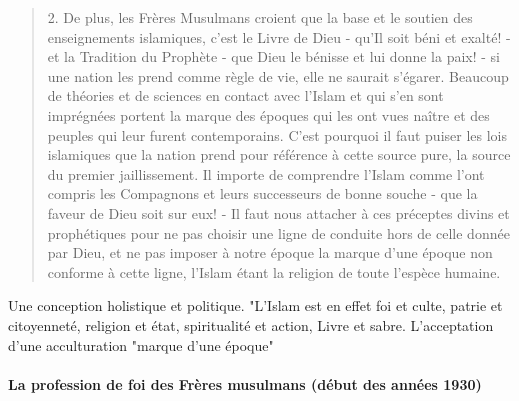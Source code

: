 \begin{quote}
2.
  De plus, les Frères Musulmans croient que la base et le soutien des
  enseignements islamiques, c'est le Livre de Dieu - qu'Il soit béni et
  exalté! - et la Tradition du Prophète - que Dieu le bénisse et lui
  donne la paix! - si une nation les prend comme règle de vie, elle ne
  saurait s'égarer. Beaucoup de théories et de sciences en contact avec
  l'Islam et qui s'en sont imprégnées portent la marque des époques qui
  les ont vues naître et des peuples qui leur furent contemporains.
  C'est pourquoi il faut puiser les lois islamiques que la nation prend
  pour référence à cette source pure, la source du premier
  jaillissement. Il importe de comprendre l'Islam comme l'ont compris
  les Compagnons et leurs successeurs de bonne souche - que la faveur de
  Dieu soit sur eux! - Il faut nous attacher à ces préceptes divins et
  prophétiques pour ne pas choisir une ligne de conduite hors de celle
  donnée par Dieu, et ne pas imposer à notre époque la marque d'une
  époque non conforme à cette ligne, l'Islam étant la religion de toute
  l'espèce humaine.
\end{quote}

  \begin{Synthesis}
   Une conception holistique et politique.  "L'Islam est en effet foi et culte, patrie et citoyenneté, religion et état, spiritualité et action, Livre et sabre.
   L'acceptation d'une acculturation "marque d'une époque"
  \end{Synthesis}
 

\paragraph{La profession de foi des Frères musulmans (début des années 1930)}




